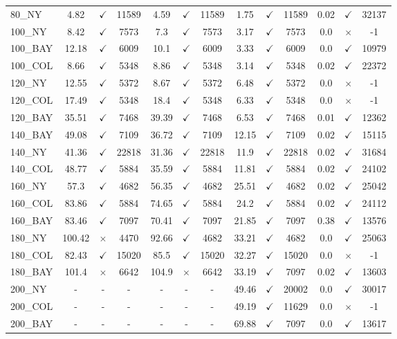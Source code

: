 \documentclass[main.tex]{subfiles}
\begin{document}
\begin{landscape}
\begin{center}
\begin{tabular}{lcccccccccccc}
80\_NY & 4.82 & $\checkmark$ & 11589 & 4.59 & $\checkmark$ & 11589 & 1.75 & $\checkmark$ & 11589 & 0.02 & $\checkmark$ & 32137\\
100\_NY & 8.42 & $\checkmark$ & 7573 & 7.3 & $\checkmark$ & 7573 & 3.17 & $\checkmark$ & 7573 & 0.0 & $\times$ & -1\\
100\_BAY & 12.18 & $\checkmark$ & 6009 & 10.1 & $\checkmark$ & 6009 & 3.33 & $\checkmark$ & 6009 & 0.0 & $\checkmark$ & 10979\\
100\_COL & 8.66 & $\checkmark$ & 5348 & 8.86 & $\checkmark$ & 5348 & 3.14 & $\checkmark$ & 5348 & 0.02 & $\checkmark$ & 22372\\
120\_NY & 12.55 & $\checkmark$ & 5372 & 8.67 & $\checkmark$ & 5372 & 6.48 & $\checkmark$ & 5372 & 0.0 & $\times$ & -1\\
120\_COL & 17.49 & $\checkmark$ & 5348 & 18.4 & $\checkmark$ & 5348 & 6.33 & $\checkmark$ & 5348 & 0.0 & $\times$ & -1\\
120\_BAY & 35.51 & $\checkmark$ & 7468 & 39.39 & $\checkmark$ & 7468 & 6.53 & $\checkmark$ & 7468 & 0.01 & $\checkmark$ & 12362\\
140\_BAY & 49.08 & $\checkmark$ & 7109 & 36.72 & $\checkmark$ & 7109 & 12.15 & $\checkmark$ & 7109 & 0.02 & $\checkmark$ & 15115\\
140\_NY & 41.36 & $\checkmark$ & 22818 & 31.36 & $\checkmark$ & 22818 & 11.9 & $\checkmark$ & 22818 & 0.02 & $\checkmark$ & 31684\\
140\_COL & 48.77 & $\checkmark$ & 5884 & 35.59 & $\checkmark$ & 5884 & 11.81 & $\checkmark$ & 5884 & 0.02 & $\checkmark$ & 24102\\
160\_NY & 57.3 & $\checkmark$ & 4682 & 56.35 & $\checkmark$ & 4682 & 25.51 & $\checkmark$ & 4682 & 0.02 & $\checkmark$ & 25042\\
160\_COL & 83.86 & $\checkmark$ & 5884 & 74.65 & $\checkmark$ & 5884 & 24.2 & $\checkmark$ & 5884 & 0.02 & $\checkmark$ & 24112\\
160\_BAY & 83.46 & $\checkmark$ & 7097 & 70.41 & $\checkmark$ & 7097 & 21.85 & $\checkmark$ & 7097 & 0.38 & $\checkmark$ & 13576\\
180\_NY & 100.42 & $\times$ & 4470 & 92.66 & $\checkmark$ & 4682 & 33.21 & $\checkmark$ & 4682 & 0.0 & $\checkmark$ & 25063\\
180\_COL & 82.43 & $\checkmark$ & 15020 & 85.5 & $\checkmark$ & 15020 & 32.27 & $\checkmark$ & 15020 & 0.0 & $\times$ & -1\\
180\_BAY & 101.4 & $\times$ & 6642 & 104.9 & $\times$ & 6642 & 33.19 & $\checkmark$ & 7097 & 0.02 & $\checkmark$ & 13603\\
200\_NY & - & - & - 
 & - & - & - 
 & 49.46 & $\checkmark$ & 20002 & 0.0 & $\checkmark$ & 30017\\
200\_COL & - & - & - 
 & - & - & - 
 & 49.19 & $\checkmark$ & 11629 & 0.0 & $\times$ & -1\\
200\_BAY & - & - & - 
 & - & - & - 
 & 69.88 & $\checkmark$ & 7097 & 0.0 & $\checkmark$ & 13617\\
\hline\end{tabular}
\end{center}
\end{landscape}
\end{document}
